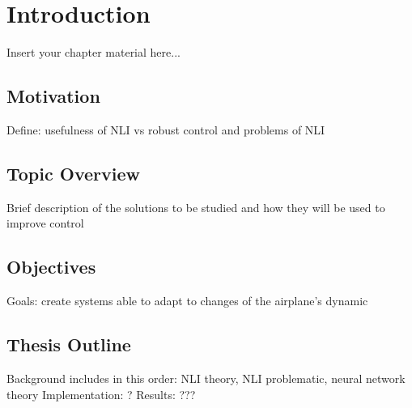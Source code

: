 
\chapter{Introduction}
\label{chapter:introduction}

Insert your chapter material here...

\section{Motivation}
\label{section:motivation}

Define: usefulness of NLI vs robust control and problems of NLI


\section{Topic Overview}
\label{section:overview}

Brief description of the solutions to be studied and how they will be used to improve control


\section{Objectives}
\label{section:objectives}

Goals: create systems able to adapt to changes of the airplane's dynamic


\section{Thesis Outline}
\label{section:outline}

Background includes in this order: NLI theory, NLI problematic, neural network theory
Implementation: ?
Results: ???


